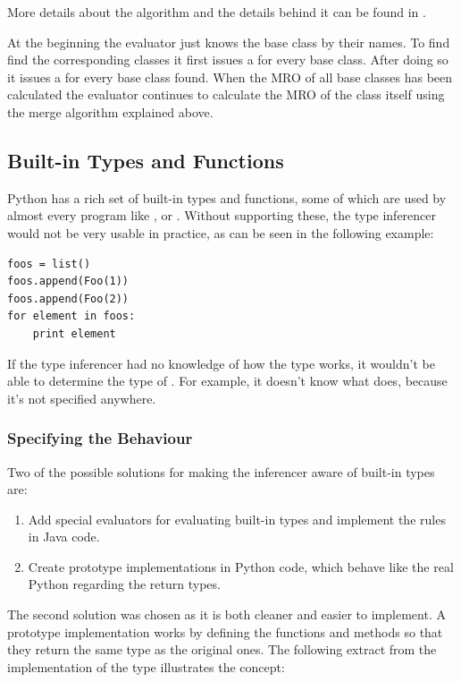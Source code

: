 \documentclass[12pt,halfparskip,DIV11,BCOR10mm]{scrreprt}
\begin{document}
More details about the algorithm and the details behind it can be found in \cite{mro}.

At the beginning the evaluator just knows the base class by their names. To find find the corresponding classes it first issues a  for every base class. After doing so it issues a  for every base class found. When the MRO of all base classes has been calculated the evaluator continues to calculate the MRO of the class itself using the merge algorithm explained above.

\subsection{Built-in Types and Functions}

Python has a rich set of built-in types and functions, some of which are used by almost every program like ,  or . Without supporting these, the type inferencer would not be very usable in practice, as can be seen in the following example:

\begin{lstlisting}
foos = list()
foos.append(Foo(1))
foos.append(Foo(2))
for element in foos:
    print element
\end{lstlisting}

If the type inferencer had no knowledge of how the  type works, it wouldn't be able to determine the type of . For example, it doesn't know what  does, because it's not specified anywhere.

\subsubsection{Specifying the Behaviour}

Two of the possible solutions for making the inferencer aware of built-in types are:

\begin{enumerate}
    \item Add special evaluators for evaluating built-in types and implement the rules in Java code.
    \item Create prototype implementations in Python code, which behave like the real Python regarding the return types.
\end{enumerate}

The second solution was chosen as it is both cleaner and easier to implement. A prototype implementation works by defining the functions and methods so that they return the same type as the original ones. The following extract from the implementation of the  type illustrates the concept:
\end{document}
